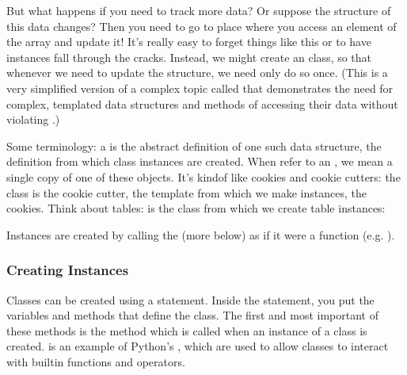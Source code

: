 \documentclass[letterpaper,10pt,english]{jupyterBook}
\begin{document}
\sphinxAtStartPar
But what happens if you need to track more data? Or suppose the structure of this data changes? Then you need to go to  place where you access an element of the array and update it! It’s really easy to forget things like this or to have instances fall through the cracks. Instead, we might create an  class, so that whenever we need to update the structure, we need only do so once. (This is a very simplified version of a complex topic called  that demonstrates the need for complex, templated data structures and methods of accessing their data without violating .)

\sphinxAtStartPar
Some terminology: a  is the abstract definition of one such data structure, the definition from which class instances are created. When refer to an , we mean a single copy of one of these objects. It’s kind\sphinxhyphen{}of like cookies and cookie cutters: the class is the cookie cutter, the template from which we make instances, the cookies. Think about tables:  is the class from which we create table instances:

\begin{sphinxVerbatim}[commandchars=\\\{\}]
 
   
\end{sphinxVerbatim}

\sphinxAtStartPar
Instances are created by calling the  (more below) as if it were a function (e.g. ).


\subsubsection{Creating Instances}
\label{\detokenize{content/07-game-theory/python-classes:creating-instances}}
\sphinxAtStartPar
Classes can be created using a  statement. Inside the statement, you put the variables and methods that define the class. The first and most important of these methods is the  method which is called when an instance of a class is created.  is an example of Python’s , which are used to allow classes to interact with built\sphinxhyphen{}in functions and operators.
\end{document}
